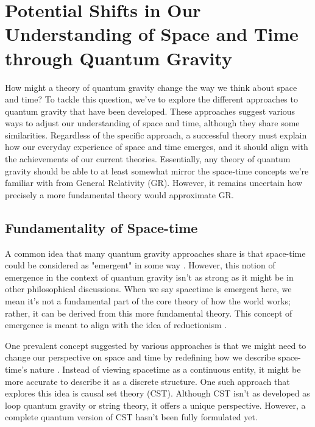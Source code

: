 \documentclass[11pt]{article}
\begin{document}
\section{Potential Shifts in Our Understanding of Space and Time through Quantum Gravity}

How might a theory of quantum gravity change the way we think about space and time? To tackle this question, we've to explore the different approaches to quantum gravity that have been developed. These approaches suggest various ways to adjust our understanding of space and time, although they share some similarities. Regardless of the specific approach, a successful theory must explain how our everyday experience of space and time emerges, and it should align with the achievements of our current theories. Essentially, any theory of quantum gravity should be able to at least somewhat mirror the space-time concepts we're familiar with from General Relativity (GR). However, it remains uncertain how precisely a more fundamental theory would approximate GR.

\subsection{Fundamentality of Space-time}

A common idea that many quantum gravity approaches share is that space-time could be considered as "emergent" in some way \cite{butterfield2011aemergence}. However, this notion of emergence in the context of quantum gravity isn't as strong as it might be in other philosophical discussions. When we say spacetime is emergent here, we mean it's not a fundamental part of the core theory of how the world works; rather, it can be derived from this more fundamental theory. This concept of emergence is meant to align with the idea of reductionism \cite{butterfield2011bemergence}.

One prevalent concept suggested by various approaches is that we might need to change our perspective on space and time by redefining how we describe space-time's nature \cite{Huggett_2013,huggett2015deriving,witten1996reflections}. Instead of viewing spacetime as a continuous entity, it might be more accurate to describe it as a discrete structure. One such approach that explores this idea is causal set theory (CST). Although CST isn't as developed as loop quantum gravity or string theory, it offers a unique perspective. However, a complete quantum version of CST hasn't been fully formulated yet\cite{wuthrich2012structure}.
\end{document}
